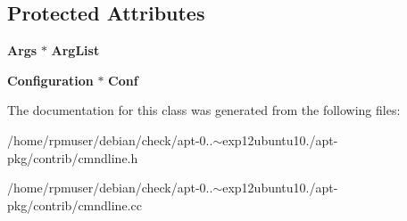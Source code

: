 \subsection*{\-Protected \-Attributes}
\begin{DoxyCompactItemize}
\item 
{\bf \-Args} $\ast$ {\bfseries \-Arg\-List}\label{classCommandLine_a6eac0dd981baa63b7ae17bcb4f4a94af}

\item 
{\bf \-Configuration} $\ast$ {\bfseries \-Conf}\label{classCommandLine_aafe4ebd997311e3d02ae67430910f03e}

\end{DoxyCompactItemize}


\-The documentation for this class was generated from the following files\-:\begin{DoxyCompactItemize}
\item 
/home/rpmuser/debian/check/apt-\/0..$\sim$exp12ubuntu10./apt-\/pkg/contrib/cmndline.\-h\item 
/home/rpmuser/debian/check/apt-\/0..$\sim$exp12ubuntu10./apt-\/pkg/contrib/cmndline.\-cc\end{DoxyCompactItemize}
